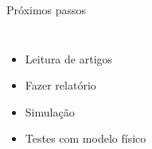 \begin{frame}[t]{Próximos passos} 
    \begin{columns}[c]
            \newline
            \begin{itemize}
                \item Leitura de artigos
                \item Fazer relatório
                \item Simulação
                \item Testes com modelo físico
            \end{itemize}
    \end{columns}

\end{frame}

   
    
   
    
